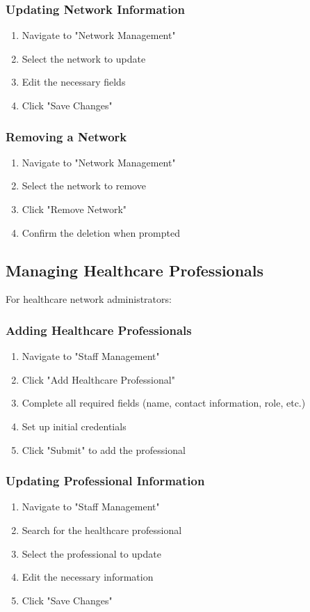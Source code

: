 \documentclass[12pt, titlepage]{article}
\begin{document}
\subsubsection{Updating Network Information}
\begin{enumerate}
\item Navigate to "Network Management"
\item Select the network to update
\item Edit the necessary fields
\item Click "Save Changes"
\end{enumerate}

\subsubsection{Removing a Network}
\begin{enumerate}
\item Navigate to "Network Management"
\item Select the network to remove
\item Click "Remove Network"
\item Confirm the deletion when prompted
\end{enumerate}

\subsection{Managing Healthcare Professionals}
For healthcare network administrators:

\subsubsection{Adding Healthcare Professionals}
\begin{enumerate}
\item Navigate to "Staff Management"
\item Click "Add Healthcare Professional"
\item Complete all required fields (name, contact information, role, etc.)
\item Set up initial credentials
\item Click "Submit" to add the professional
\end{enumerate}

\subsubsection{Updating Professional Information}
\begin{enumerate}
\item Navigate to "Staff Management"
\item Search for the healthcare professional
\item Select the professional to update
\item Edit the necessary information
\item Click "Save Changes"
\end{enumerate}
\end{document}
